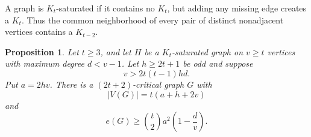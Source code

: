 \documentclass[11pt]{article}
\newtheorem{proposition}[theorem]{Proposition}
\numberwithin{equation}{section}
\begin{document}
A graph is \(K_t\)-saturated if it contains no \(K_t\), but adding
any missing edge creates a \(K_t\). Thus the common neighborhood
of every pair of distinct nonadjacent vertices contains a \(K_{t-2}\).

\begin{proposition}\label{prop:conversion}
Let \(t\ge3\), and let \(H\) be a \(K_t\)-saturated graph on
\(v\ge t\) vertices with maximum degree \(d<v-1\).
Let \(h\ge2t+1\) be odd and suppose
\begin{equation}\label{eq:degree-condition}
 v>2t(t-1)hd.
\end{equation}
Put \(a=2hv\). There is a \((2t+2)\)-critical graph \(G\) with
\begin{equation}\label{eq:order}
 |V(G)|=t(a+h+2v)
\end{equation}
and
\begin{equation}\label{eq:edge-bound}
 e(G)\ge\binom t2 a^2\left(1-\frac d v\right).
\end{equation}
\end{proposition}
\end{document}
